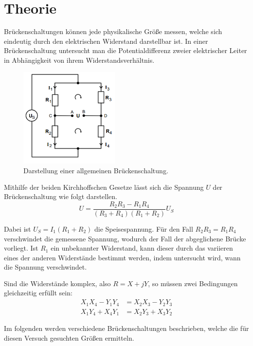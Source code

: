 \section{Theorie}
\label{sec:Theorie}

Brückenschaltungen können jede physikalische Größe messen, welche sich eindeutig durch den
elektrischen Widerstand darstellbar ist. In einer Brückenschaltung untersucht man die Potentialdifferenz zweier elektrischer Leiter
in Abhängigkeit von ihrem Widerstandsverhältnis.


\begin{figure}[H]
  \centering
  \includegraphics[height=5cm]{bruecke.PNG}
  \caption{Darstellung einer allgemeinen Brückenschaltung. \cite{sample}}
  \label{fig:Brückenschaltung}
\end{figure}

Mithilfe der beiden Kirchhoffschen Gesetze lässt sich die Spannung $U$ der Brückenschaltung wie folgt darstellen.
\begin{equation}
  U = \frac{R_2 R_3 - R_1 R_4}{(R_3+R_4)(R_1+R_2)}U_S
\end{equation}

Dabei ist $U_S = I_1(R_1+R_2)$ die Speisespannung. Für den Fall $R_2R_3=R_1R_4$ verschwindet die gemessene Spannung, wodurch der Fall
der abgeglichene Brücke vorliegt. Ist $R_1$ ein unbekannter Widerstand, kann dieser durch das variieren eines der anderen Widerstände bestimmt werden,
indem untersucht wird, wann die Spannung verschwindet.

Sind die Widerstände komplex, also $R= X + jY$, so müssen zwei Bedingungen gleichzeitig erfüllt sein:
\begin{align}
  X_1X_4 -Y_1Y_4 &= X_2X_3 - Y_2Y_3 \\
  X_1Y_4 +X_4Y_1 &= X_2Y_3 + X_3Y_2
\end{align}


Im folgenden werden verschiedene
Brückenschaltungen beschrieben, welche die für diesen Versuch gesuchten Größen ermitteln.

